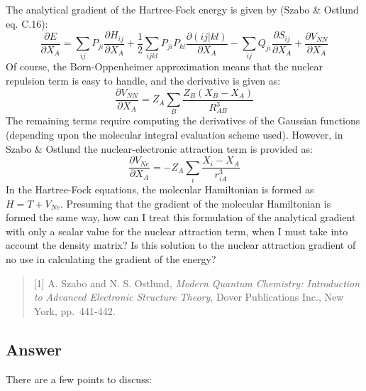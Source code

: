 \documentclass[%
class = book,%
crop = false,%
float = true,%
multi = true,%
preview = false,%
]{standalone}
\begin{document}
The analytical gradient of the Hartree-Fock energy is given by (Szabo \& Ostlund eq. C.16):
\begin{equation}
  \frac{\partial E}{\partial X_{A}} = \sum_{ij}{P_{ji} \frac{\partial H_{ij}}{\partial X_{A}}} + \frac{1}{2} \sum_{ijkl}{P_{ji}P_{kl} \frac{\partial (ij|kl)}{\partial X_{A}}} - \sum_{ij}{Q_{ji} \frac{\partial S_{ij}}{\partial X_{A}}} + \frac{\partial V_{NN}}{\partial X_{A}}
\end{equation}
Of course, the Born-Oppenheimer approximation means that the nuclear repulsion term is easy to handle, and the derivative is given as:
\begin{equation}
  \frac{\partial V_{NN}}{\partial X_{A}} = Z_{A} \sum_{B} \frac{Z_{B} (X_{B} - X_{A})}{R_{AB}^{3}}
\end{equation}
The remaining terms require computing the derivatives of the Gaussian functions (depending upon the molecular integral evaluation scheme used). However, in Szabo \& Ostlund the nuclear-electronic attraction term is provided as:
\begin{equation}
  \frac{\partial V_{Ne}}{\partial X_{A}} = -Z_{A} \sum_{i} \frac{X_{i} - X_{A}}{r_{iA}^{3}}
\end{equation}
In the Hartree-Fock equations, the molecular Hamiltonian is formed as \(H = T + V_{Ne}\). Presuming that the gradient of the molecular Hamiltonian is formed the same way, how can I treat this formulation of the analytical gradient with only a scalar value for the nuclear attraction term, when I must take into account the density matrix? Is this solution to the nuclear attraction gradient of no use in calculating the gradient of the energy?

\begin{quote}
{[}1{]} A. Szabo and N. S. Ostlund, \emph{Modern Quantum Chemistry: Introduction to Advanced Electronic Structure Theory}, Dover Publications Inc., New York, pp.~441-442.
\end{quote}

\subsection{Answer}

There are a few points to discuss:
\end{document}
